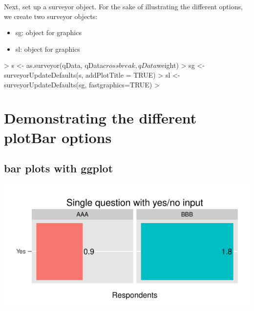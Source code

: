 \documentclass[10pt,oneside]{article}
\begin{document}
Next, set up a surveyor object.  For the sake of illustrating the different options, we create two surveyor objects:
\begin{itemize}
\item sg: \surveyor{} object for \ggplot{} graphics
\item sl: \surveyor{} object for  graphics
\end{itemize}

\begin{Schunk}
\begin{Sinput}
> s <- as.surveyor(qData, qData$crossbreak, qData$weight)
> sg <- surveyorUpdateDefaults(s, addPlotTitle = TRUE)
> sl <- surveyorUpdateDefaults(sg, fastgraphics=TRUE)
> 
\end{Sinput}
\end{Schunk}


\section{Demonstrating the different plotBar options}


\subsection{bar plots with ggplot}


\begin{Schunk}
\end{Schunk}
\includegraphics{graphics/figure-003}
\end{document}

